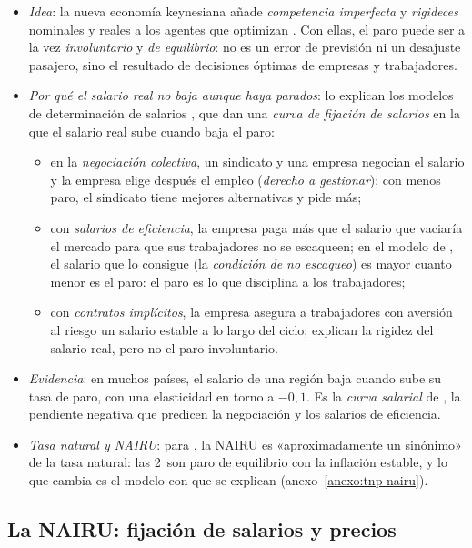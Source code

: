 \documentclass[11pt]{article}
\begin{document}
\begin{itemize}
\item \emph{Idea}: la nueva economía keynesiana añade \emph{competencia imperfecta} y \emph{rigideces} nominales y reales a los agentes que optimizan . Con ellas, el paro puede ser a la vez \emph{involuntario} y \emph{de equilibrio}: no es un error de previsión ni un desajuste pasajero, sino el resultado de decisiones óptimas de empresas y trabajadores.
\item \emph{Por qué el salario real no baja aunque haya parados}: lo explican los modelos de determinación de salarios , que dan una \emph{curva de fijación de salarios} en la que el salario real sube cuando baja el paro:
  \begin{itemize}
  \item en la \emph{negociación colectiva}, un sindicato y una empresa negocian el salario y la empresa elige después el empleo (\emph{derecho a gestionar}); con menos paro, el sindicato tiene mejores alternativas y pide más;
  \item con \emph{salarios de eficiencia}, la empresa paga más que el salario que vaciaría el mercado para que sus trabajadores no se escaqueen; en el modelo de \textcite{ShapiroStiglitz1984Equilibrium}, el salario que lo consigue (la \emph{condición de no escaqueo}) es mayor cuanto menor es el paro: el paro es lo que disciplina a los trabajadores;
  \item con \emph{contratos implícitos}, la empresa asegura a trabajadores con aversión al riesgo un salario estable a lo largo del ciclo; explican la rigidez del salario real, pero no el paro involuntario.
  \end{itemize}
\item \emph{Evidencia}: en muchos países, el salario de una región baja cuando sube su tasa de paro, con una elasticidad en torno a $-0{,}1$. Es la \emph{curva salarial} de \textcite{BlanchflowerOswald1994Wage}, la pendiente negativa que predicen la negociación y los salarios de eficiencia.
\item \emph{Tasa natural y NAIRU}: para \textcite{BallMankiw2002NAIRU}, la NAIRU es «aproximadamente un sinónimo» de la tasa natural: las 2~son paro de equilibrio con la inflación estable, y lo que cambia es el modelo con que se explican (anexo~\ref{anexo:tnp-nairu}).
\end{itemize}

\subsection{La NAIRU: fijación de salarios y precios}\label{sec:nairu}
\end{document}
